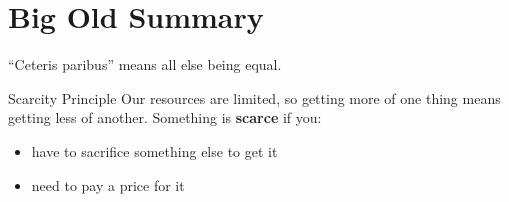 \chapter{Big Old Summary}

``Ceteris paribus'' means all else being equal.

\begin{note}{Scarcity Principle}
	Our resources are limited, so getting more of one thing means getting less of another. Something is \textbf{scarce} if you:
	\begin{itemize}
		\item have to sacrifice something else to get it
		\item need to pay a price for it
	\end{itemize}
\end{note}


